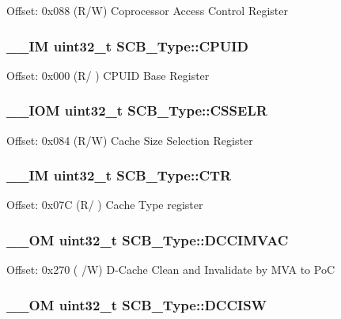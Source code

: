 Offset\-: 0x088 (R/\-W) Coprocessor Access Control Register \hypertarget{struct_s_c_b___type_a21e08d546d8b641bee298a459ea73e46}{
\subsubsection[{C\-P\-U\-I\-D}]{\setlength{\rightskip}{0pt plus 5cm}\-\_\-\-\_\-\-I\-M uint32\-\_\-t S\-C\-B\-\_\-\-Type\-::\-C\-P\-U\-I\-D}}\label{struct_s_c_b___type_a21e08d546d8b641bee298a459ea73e46}
Offset\-: 0x000 (R/ ) C\-P\-U\-I\-D Base Register \hypertarget{struct_s_c_b___type_ad3884e8b6504ec63c1eaa8742e94df3d}{
\subsubsection[{C\-S\-S\-E\-L\-R}]{\setlength{\rightskip}{0pt plus 5cm}\-\_\-\-\_\-\-I\-O\-M uint32\-\_\-t S\-C\-B\-\_\-\-Type\-::\-C\-S\-S\-E\-L\-R}}\label{struct_s_c_b___type_ad3884e8b6504ec63c1eaa8742e94df3d}
Offset\-: 0x084 (R/\-W) Cache Size Selection Register \hypertarget{struct_s_c_b___type_af3fe705fef8762763b6d61dbdf0ccc3d}{
\subsubsection[{C\-T\-R}]{\setlength{\rightskip}{0pt plus 5cm}\-\_\-\-\_\-\-I\-M uint32\-\_\-t S\-C\-B\-\_\-\-Type\-::\-C\-T\-R}}\label{struct_s_c_b___type_af3fe705fef8762763b6d61dbdf0ccc3d}
Offset\-: 0x07\-C (R/ ) Cache Type register \hypertarget{struct_s_c_b___type_a4f59813582b53feb5f1afbbad3db2022}{
\subsubsection[{D\-C\-C\-I\-M\-V\-A\-C}]{\setlength{\rightskip}{0pt plus 5cm}\-\_\-\-\_\-\-O\-M uint32\-\_\-t S\-C\-B\-\_\-\-Type\-::\-D\-C\-C\-I\-M\-V\-A\-C}}\label{struct_s_c_b___type_a4f59813582b53feb5f1afbbad3db2022}
Offset\-: 0x270 ( /\-W) D-\/\-Cache Clean and Invalidate by M\-V\-A to Po\-C \hypertarget{struct_s_c_b___type_af50f7a0a9574fe0e24a68bb4eca75140}{
\subsubsection[{D\-C\-C\-I\-S\-W}]{\setlength{\rightskip}{0pt plus 5cm}\-\_\-\-\_\-\-O\-M uint32\-\_\-t S\-C\-B\-\_\-\-Type\-::\-D\-C\-C\-I\-S\-W}}\label{struct_s_c_b___type_af50f7a0a9574fe0e24a68bb4eca75140}
